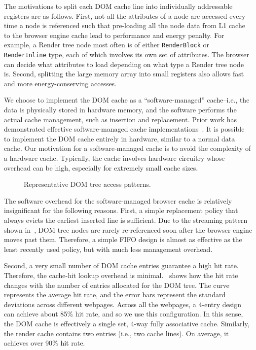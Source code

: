 The motivations to split each DOM cache line into individually addressable registers are as follows. First, not all the attributes of a node are accessed every time a node is referenced such that pre-loading all the node data from L1 cache to the browser engine cache lead to performance and energy penalty. For example, a Render tree node most often is of either \texttt{RenderBlock} or \texttt{RenderInline} type, each of which involves its own set of attributes. The browser can decide what attributes to load depending on what type a Render tree node is. Second, splitting the large memory array into small registers also allows fast and more energy-conserving accesses.

We choose to implement the DOM cache as a ``software-managed'' cache--i.e., the data is physically stored in hardware memory, and the software performs the actual cache management, such as insertion and replacement. Prior work has demonstrated effective software-managed cache implementations~\cite{Hallnor:2000:FAS:339647.339660}. It is possible to implement the DOM cache entirely in hardware, similar to a normal data cache. Our motivation for a software-managed cache is to avoid the complexity of a hardware cache. Typically, the cache involves hardware circuitry whose overhead can be high, especially for extremely small cache sizes.

\begin{figure}[t]
\centering
{}
\hspace*{15pt}
\caption{\small Representative DOM tree access patterns.}
\label{fig:data-acs}
\end{figure}

The software overhead for the software-managed browser cache is relatively insignificant for the following reasons. First, a simple replacement policy that always evicts the earliest inserted line is sufficient. Due to the streaming pattern shown in~, DOM tree nodes are rarely re-referenced soon after the browser engine moves past them. Therefore, a simple FIFO design is almost as effective as the least recently used policy, but with much less management overhead.

Second, a very small number of DOM cache entries guarantee a high hit rate. Therefore, the cache-hit lookup overhead is minimal.~ shows how the hit rate changes with the number of entries allocated for the DOM tree. The curve represents the average hit rate, and the error bars represent the standard deviations across different webpages. Across all the webpages, a 4-entry design can achieve about 85\% hit rate, and so we use this configuration. In this sense, the DOM cache is effectively a single set, 4-way fully associative cache. Similarly, the render cache contains two entries (i.e., two cache lines). On average, it achieves over 90\% hit rate.

